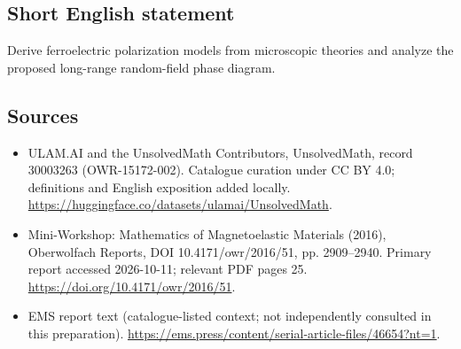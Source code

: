 \documentclass[11pt]{article}
\begin{document}
\subsection{Short English statement}
Derive ferroelectric polarization models from microscopic theories and analyze the proposed long-range random-field phase diagram.
\subsection{Sources}
\begin{itemize}
\item[\hypertarget{source:30003263:1}{S1}] ULAM.AI and the UnsolvedMath Contributors, UnsolvedMath, record 30003263 (OWR-15172-002). Catalogue curation under CC BY 4.0; definitions and English exposition added locally.
\url{https://huggingface.co/datasets/ulamai/UnsolvedMath}.
\item[\hypertarget{source:30003263:2}{S2}] Mini-Workshop: Mathematics of Magnetoelastic Materials (2016), Oberwolfach Reports, DOI 10.4171/owr/2016/51, pp. 2909--2940. Primary report accessed 2026-10-11; relevant PDF pages 25.
\url{https://doi.org/10.4171/owr/2016/51}.
\item[\hypertarget{source:30003263:3}{S3}] EMS report text (catalogue-listed context; not independently consulted in this preparation).
\url{https://ems.press/content/serial-article-files/46654?nt=1}.
\end{itemize}
\label{end:30003263}
\end{document}
